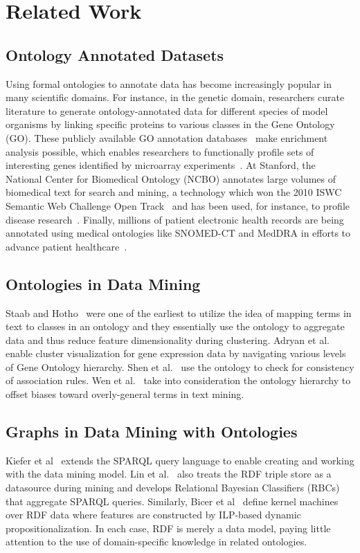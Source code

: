 \section{Related Work}
\subsection{Ontology Annotated Datasets}
Using formal ontologies to annotate data has become increasingly popular in many scientific domains. For instance, in the genetic domain, researchers curate literature to generate ontology-annotated data for different species of model organisms by linking specific proteins to various classes in the Gene Ontology (GO). These publicly available GO annotation databases~\cite{GOAurl} make enrichment analysis possible, which enables researchers to functionally profile sets of interesting genes identified by microarray experiments~\cite{Khatri2005}.  At Stanford, the National Center for Biomedical Ontology (NCBO) annotates large volumes of biomedical text for search and mining, a technology which won the 2010 ISWC Semantic Web Challenge Open Track~\cite{RI,SWCurl} and has been used, for instance, to profile disease research~\cite{Liu2012}.  Finally, millions of patient electronic health records are being annotated using medical ontologies like SNOMED-CT and MedDRA in efforts to advance patient healthcare~\cite{OMOP}.

\subsection{Ontologies in Data Mining}
Staab and Hotho~\cite{StaabH03} were one of the earliest to utilize the idea of mapping terms in text to classes in an ontology and they essentially use the ontology to aggregate data and thus reduce feature dimensionality during clustering.  Adryan et al.~\cite{Adryan2004} enable cluster visualization for gene expression data by navigating various levels of Gene Ontology hierarchy.  Shen et al.~\cite{Shen2006Ont} use the ontology to check for consistency of association rules. Wen et al.~\cite{Wen2007Ont} take into consideration the ontology hierarchy to offset biases toward overly-general terms in text mining. 

\subsection{Graphs in Data Mining with Ontologies}
Kiefer et al~\cite{Kiefer2008Adding} extends the SPARQL query language to enable creating and working with the data mining model. Lin et al.~\cite{Lin2011Learning} also treats the RDF triple store as a datasource during mining and develops Relational Bayesian Classifiers (RBCs) that aggregate SPARQL queries. Similarly, Bicer et al~\cite{Bicer2011Relational} define kernel machines over RDF data where features are constructed by ILP-based dynamic propositionalization. In each case, RDF is merely a data model, paying little attention to the use of domain-specific knowledge in related ontologies. 